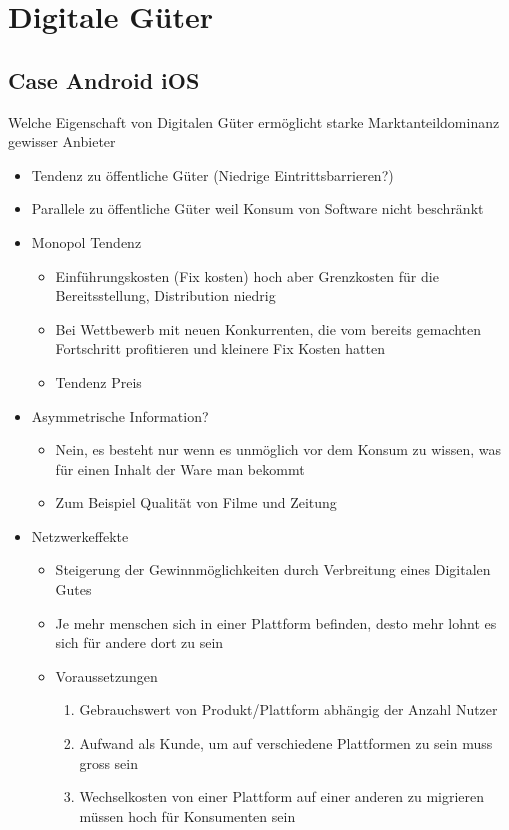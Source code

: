 
\section{Digitale Güter}

\subsection{Case Android iOS}
    Welche Eigenschaft von Digitalen Güter ermöglicht starke Marktanteildominanz gewisser Anbieter
    \begin{itemize}
        \item Tendenz zu öffentliche Güter (Niedrige Eintrittsbarrieren?)
        \item Parallele zu öffentliche Güter weil Konsum von Software nicht beschränkt
        \item Monopol Tendenz
        \begin{itemize}
            \item Einführungskosten (Fix kosten) hoch aber Grenzkosten für die Bereitsstellung, Distribution niedrig
            \item Bei Wettbewerb mit neuen Konkurrenten, die vom bereits gemachten Fortschritt profitieren und kleinere Fix Kosten hatten
            \item Tendenz Preis 
        \end{itemize}
        \item Asymmetrische Information?
        \begin{itemize}
            \item Nein, es besteht nur wenn es unmöglich vor dem Konsum zu wissen, was für einen Inhalt der Ware man bekommt
            \item Zum Beispiel Qualität von Filme und Zeitung 
        \end{itemize}
        \item Netzwerkeffekte
        \begin{itemize}
            \item Steigerung der Gewinnmöglichkeiten durch Verbreitung eines Digitalen Gutes
            \item Je mehr menschen sich in einer Plattform befinden, desto mehr lohnt es sich für andere dort zu sein
            \item Voraussetzungen
            \begin{enumerate}
                \item Gebrauchswert von Produkt/Plattform abhängig der Anzahl Nutzer
                \item Aufwand als Kunde, um auf verschiedene Plattformen zu sein muss gross sein
                \item Wechselkosten von einer Plattform auf einer anderen zu migrieren müssen hoch für Konsumenten sein
            \end{enumerate}
        \end{itemize}
    \end{itemize}

